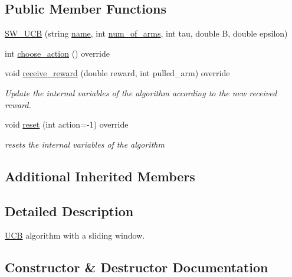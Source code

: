 \subsection*{Public Member Functions}
\begin{DoxyCompactItemize}
\item 
\mbox{\hyperlink{class_s_w___u_c_b_ab79ee79598a2bc5b58a854257092ac26}{S\+W\+\_\+\+U\+CB}} (string \mbox{\hyperlink{class_m_a_b_algorithm_a77b10ecc4b49d519c557f65358167b82}{name}}, int \mbox{\hyperlink{class_m_a_b_algorithm_a340fa9e83e85b092f2c6125fc4e8549b}{num\+\_\+of\+\_\+arms}}, int tau, double B, double epsilon)
\item 
int \mbox{\hyperlink{class_s_w___u_c_b_a819ec3b60cd7a8e5f3983b979d3d765f}{choose\+\_\+action}} () override
\item 
void \mbox{\hyperlink{class_s_w___u_c_b_acddb0c5385d33d332a2fbf1b739142c2}{receive\+\_\+reward}} (double reward, int pulled\+\_\+arm) override
\begin{DoxyCompactList}\small\item\em Update the internal variables of the algorithm according to the new received reward. \end{DoxyCompactList}\item 
void \mbox{\hyperlink{class_s_w___u_c_b_afbbe9a17cc00402d2487260b530bbee2}{reset}} (int action=-\/1) override
\begin{DoxyCompactList}\small\item\em resets the internal variables of the algorithm \end{DoxyCompactList}\end{DoxyCompactItemize}
\subsection*{Additional Inherited Members}


\subsection{Detailed Description}
\mbox{\hyperlink{class_u_c_b}{U\+CB}} algorithm with a sliding window. 

\subsection{Constructor \& Destructor Documentation}
\mbox{\label{class_s_w___u_c_b_ab79ee79598a2bc5b58a854257092ac26}} 
